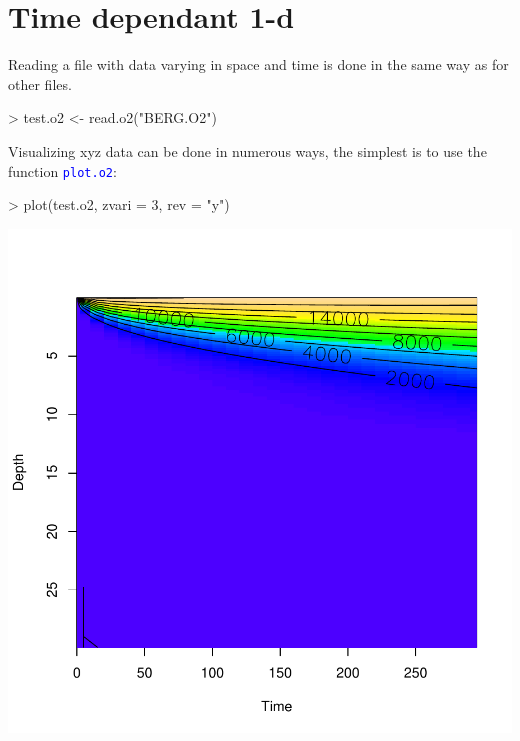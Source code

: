 \documentclass{scrartcl}
\newcommand{\Rcode}[1]{\texttt{\textcolor{blue}{#1}}}
\begin{document}
\section{Time dependant 1-d}

Reading a file with data varying in space and time is done in the same
way as for other files.  

\begin{Schunk}
\begin{Sinput}
> test.o2 <- read.o2("BERG.O2")
\end{Sinput}
\end{Schunk}
Visualizing xyz data can be done in numerous ways, the simplest is to
use the function \Rcode{plot.o2}:

\begin{Schunk}
\begin{Sinput}
> plot(test.o2, zvari = 3, rev = "y")
\end{Sinput}
\end{Schunk}
\includegraphics{figures/f-1Db}
\end{document}
